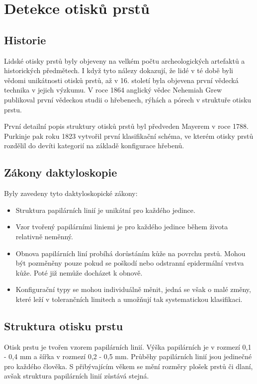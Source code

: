 \chapter{Detekce otisků prstů}
\section{Historie}
Lidské otisky prstů byly objeveny na velkém počtu archeologických artefaktů a historických předmětech. I když tyto nálezy dokazují, že lidé v té době byli vědomi unikátnosti otisků prstů, až v 16. století byla objevena první vědecká technika v jejich výzkumu. V roce 1864 anglický vědec Nehemiah Grew publikoval první vědeckou studii o hřebenech, rýhách a pórech v struktuře otisku prstu.

První detailní popis struktury otisků prstů byl předveden Mayerem v roce 1788. Purkinje pak roku 1823 vytvořil první klasifikační schéma, ve kterém otisky prstů rozdělil do devíti kategorií na základě konfigurace hřebenů.\cite{Maltoni2009}

\section{Zákony daktyloskopie}
Byly zavedeny tyto daktyloskopické zákony\cite{Drahansky}:
\begin{itemize}
    \item Struktura papilárních linií je unikátní pro každého jedince.
    \item Vzor tvořený papilárními liniemi je pro každého jedince během života relativně neměnný.
    \item Obnova papilárních liní probíhá dorůstáním kůže na povrchu prstů. Mohou být pozměněny pouze pokud se poškodí nebo odstranní epidermální vrstva kůže. Poté již nemůže docházet k obnově.
    \item Konfigurační typy se mohou individuálně měnit, jedná se však o malé změny, které leží v tolerančních limitech a umožňují tak systematickou klasifikaci.
\end{itemize}

\section{Struktura otisku prstu}
Otisk prstu je tvořen vzorem papilárních linií. Výška papilárních je v rozmezí 0,1 - 0,4 mm a šířka v rozmezí 0,2 - 0,5 mm.\cite{Drahansky} Průběhy papilárních linií jsou jedinečné pro každého člověka. S přibývajícím věkem se mění rozměry plošek prstů či dlaní, avšak struktura papilárních linií zůstává stejná.


